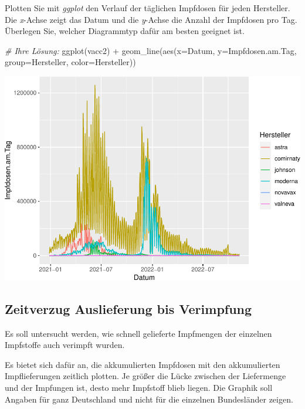 \documentclass[
]{article}
\newenvironment{Shaded}{\begin{snugshade}}{\end{snugshade}}
\newcommand{\AttributeTok}[1]{\textcolor[rgb]{0.77,0.63,0.00}{#1}}
\newcommand{\CommentTok}[1]{\textcolor[rgb]{0.56,0.35,0.01}{\textit{#1}}}
\newcommand{\FunctionTok}[1]{\textcolor[rgb]{0.00,0.00,0.00}{#1}}
\newcommand{\NormalTok}[1]{#1}
\newcommand{\SpecialCharTok}[1]{\textcolor[rgb]{0.00,0.00,0.00}{#1}}
\begin{document}
Plotten Sie mit \emph{ggplot} den Verlauf der täglichen Impfdosen für
jeden Hersteller. Die \emph{x}-Achse zeigt das Datum und die
\emph{y}-Achse die Anzahl der Impfdosen pro Tag. Überlegen Sie, welcher
Diagrammtyp dafür am besten geeignet ist.

\begin{Shaded}
\begin{Highlighting}[]
\CommentTok{\# Ihre Lösung:}
\FunctionTok{ggplot}\NormalTok{(vacc2) }\SpecialCharTok{+} \FunctionTok{geom\_line}\NormalTok{(}\FunctionTok{aes}\NormalTok{(}\AttributeTok{x=}\NormalTok{Datum, }\AttributeTok{y=}\NormalTok{Impfdosen.am.Tag, }\AttributeTok{group=}\NormalTok{Hersteller, }\AttributeTok{color=}\NormalTok{Hersteller))}
\end{Highlighting}
\end{Shaded}

\includegraphics{Testat_1_Complete_files/figure-latex/unnamed-chunk-16-1.pdf}

\hypertarget{zeitverzug-auslieferung-bis-verimpfung}{%
\subsection{Zeitverzug Auslieferung bis
Verimpfung}\label{zeitverzug-auslieferung-bis-verimpfung}}

Es soll untersucht werden, wie schnell gelieferte Impfmengen der
einzelnen Impfstoffe auch verimpft wurden.

Es bietet sich dafür an, die akkumulierten Impfdosen mit den
akkumulierten Impflieferungen zeitlich plotten. Je größer die Lücke
zwischen der Liefermenge und der Impfungen ist, desto mehr Impfstoff
blieb liegen. Die Graphik soll Angaben für ganz Deutschland und nicht
für die einzelnen Bundesländer zeigen.
\end{document}
